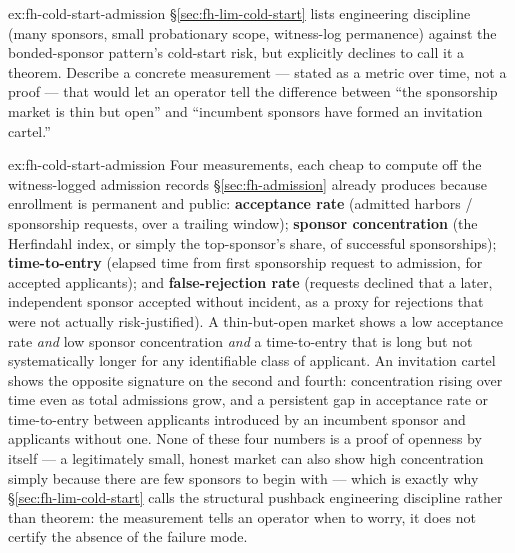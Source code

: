 \documentclass[11pt,a4paper]{article}
\theoremstyle{definition}
\theoremstyle{remark}
\begin{document}
\begin{pdexercise}[kind=Open,rating=3]{ex:fh-cold-start-admission}
\S\ref{sec:fh-lim-cold-start} lists engineering discipline (many sponsors, small probationary scope, witness-log permanence) against the bonded-sponsor pattern's cold-start risk, but explicitly declines to call it a theorem. Describe a concrete measurement --- stated as a metric over time, not a proof --- that would let an operator tell the difference between ``the sponsorship market is thin but open'' and ``incumbent sponsors have formed an invitation cartel.''
\end{pdexercise}
\begin{pdsolution}{ex:fh-cold-start-admission}
Four measurements, each cheap to compute off the witness-logged admission records \S\ref{sec:fh-admission} already produces because enrollment is permanent and public: \textbf{acceptance rate} (admitted harbors / sponsorship requests, over a trailing window); \textbf{sponsor concentration} (the Herfindahl index, or simply the top-sponsor's share, of successful sponsorships); \textbf{time-to-entry} (elapsed time from first sponsorship request to admission, for accepted applicants); and \textbf{false-rejection rate} (requests declined that a later, independent sponsor accepted without incident, as a proxy for rejections that were not actually risk-justified). A thin-but-open market shows a low acceptance rate \emph{and} low sponsor concentration \emph{and} a time-to-entry that is long but not systematically longer for any identifiable class of applicant. An invitation cartel shows the opposite signature on the second and fourth: concentration rising over time even as total admissions grow, and a persistent gap in acceptance rate or time-to-entry between applicants introduced by an incumbent sponsor and applicants without one. None of these four numbers is a proof of openness by itself --- a legitimately small, honest market can also show high concentration simply because there are few sponsors to begin with --- which is exactly why \S\ref{sec:fh-lim-cold-start} calls the structural pushback engineering discipline rather than theorem: the measurement tells an operator when to worry, it does not certify the absence of the failure mode.
\end{pdsolution}
\end{document}
